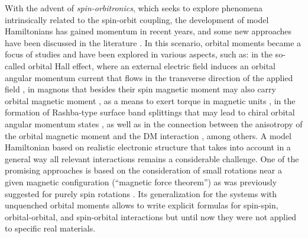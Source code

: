 \documentclass[prl,final,twocolumn]{revtex4-1}
\begin{document}
With the advent of {\it spin-orbitronics}, which seeks to explore phenomena intrinsically related to the spin-orbit coupling, 
the development of model Hamiltonians has gained momentum in recent years, and some new approaches have been discussed in the literature \cite{SECCHI201561,mankovsky2020extension,laszloffy2019magnetic,grytsiuk2020topological,cardiasDzyaloshinskiiMoriyaInteractionAbsence2020}.
 In this scenario, orbital moments became a focus of studies and have been explored in various aspects, such as: in the so-called orbital Hall effect, where an external electric field induces an orbital angular momentum current that flows in the transverse direction of the applied field    \cite{tanaka2008intrinsic,kontani2009giant,go2018intrinsic}, in magnons that besides their spin magnetic moment may also carry orbital magnetic moment \cite{neumann2020orbital}, as a means to exert torque in magnetic units \cite{PhysRevResearch.2.013177}, in the formation of Rashba-type surface band splittings that may lead to chiral orbital angular momentum states \cite{park2011orbital,park2013orbital}, as well as in the connection between the anisotropy of the orbital magnetic moment and the DM interaction \cite{kim2018correlation}, among others.
A model Hamiltonian based on realistic electronic structure that takes into account in a general way all relevant interactions 
remains a considerable challenge. One of the promising approaches is based on the consideration of small rotations near a given magnetic configuration (``magnetic force theorem'') as was previously suggested for purely spin rotations \cite{liechtensteinLocalSpinDensity1987,PhysRevB.61.8906}. Its generalization for the systems with unquenched orbital moments \cite{SECCHI201561,PhysRevB.94.115117} allows to write explicit formulas for spin-spin, orbital-orbital, and spin-orbital interactions but until now they were not applied to specific real materials.  
 
\end{document}
